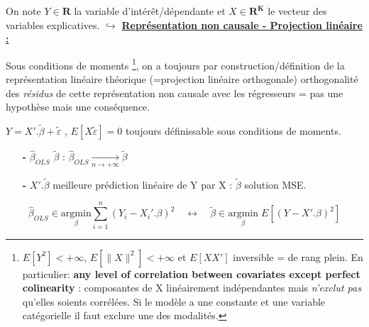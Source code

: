

\noindent \textbf{}
\noindent On note $Y \in \mathbf{R}$ la variable d'intérêt/dépendante et $X \in \mathbf{R}^{\textbf{K}}$ le vecteur des variables explicatives.
\bigbreak
\noindent $\hookrightarrow$ \underline{\textbf{Représentation non causale - Projection linéaire :}}\par
Sous conditions de moments \footnote{$E[Y^{2}]<+\infty$, $E[\lVert X \rVert^{2}]<+\infty$ et $E[XX']$ inversible = de rang plein. En particulier: \textbf{any level of correlation between covariates except perfect colinearity} : composantes de X linéairement indépendantes mais \textit{n'exclut pas} qu'elles soients corrélées. Si le modèle a une constante et une variable catégorielle il faut exclure une des modalités.}, on a toujours par construction/définition de la représentation linéaire théorique (=projection linéaire orthogonale) orthogonalité des \textit{résidus} de cette représentation non causale avec les régresseurs = pas une hypothèse mais une conséquence.\par
\begin{boxH}
    $Y = X'.\widetilde{\beta} + \widetilde{\varepsilon}$ , $E[X\widetilde{\varepsilon}]=0$ toujours définissable sous conditions de moments.\par
    \begin{itemize}
        \item[\textbf{-}] $\widehat{\beta}_{OLS}$  $\widetilde{\beta}$ : $\widehat{\beta}_{OLS} \underset{n \to +\infty}{\longrightarrow} \widetilde{\beta}$\par
        \item[\textbf{-}] $X'.\widetilde{\beta}$ meilleure prédiction linéaire de Y par X : $\widetilde{\beta}$ solution MSE.
    \end{itemize}
\end{boxH}

\begin{equation*} 
    \widehat{\beta}_{OLS} \in \underset{\beta}{\mathrm{argmin}} \sum_{i = 1}^{n}{(Y_{i} - X_{i}'.\beta)^{2}} \quad \longleftrightarrow \quad \widetilde{\beta} \in \underset{\beta}{\mathrm{argmin}} \; E[(Y-X'.\beta)^{2}]
\end{equation*}
\bigbreak


